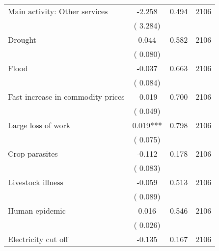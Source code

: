 \begin{tabular}{l*{3}{c}}
 Main activity: Other services                 &             -2.258          &        0.494 & 2106          \\ 
                               &        (       3.284)             &                        &                              \\ 
 Drought                &              0.044        &        0.582   & 2106              \\ 
                               &        (       0.080)            &                               &                               \\ 
 Flood                &             -0.037        &        0.663   & 2106              \\ 
                               &        (       0.084)            &                               &                               \\ 
 Fast increase in commodity prices                &             -0.019        &        0.700   & 2106              \\ 
                               &        (       0.049)            &                               &                               \\ 
 Large loss of work                &              0.019***        &        0.798   & 2106              \\ 
                               &        (       0.075)            &                               &                               \\ 
 Crop parasites                &             -0.112        &        0.178   & 2106              \\ 
                               &        (       0.083)            &                               &                               \\ 
 Livestock illness                &             -0.059        &        0.513   & 2106              \\ 
                               &        (       0.089)            &                               &                               \\ 
 Human epidemic                &              0.016        &        0.546   & 2106              \\ 
                               &        (       0.026)            &                               &                               \\ 
 Electricity cut off                &             -0.135        &        0.167   & 2106              \\ 

\end{tabular}
